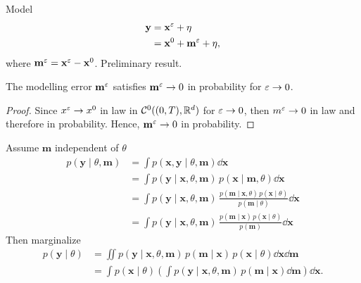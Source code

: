 \documentclass[10pt]{article}
\begin{document}
Model 
\begin{equation}
\begin{aligned}
	\mathbf y &= \mathbf x^\varepsilon + \eta \\
	&= \mathbf x^0 + \mathbf m^\varepsilon + \eta,
\end{aligned}
\end{equation}
where $\mathbf m^\varepsilon = \mathbf x^\varepsilon - \mathbf x^0$. Preliminary result.
\begin{lemma} The modelling error $\mathbf m^\varepsilon$ satisfies $\mathbf m^\varepsilon \to 0$ in probability for $\varepsilon \to 0$.
\end{lemma}
\begin{proof} Since $x^\varepsilon \to x^0$ in law in $\mathcal C^0((0, T), \mathbb{R}^d)$ for $\varepsilon \to 0$, then $m^\varepsilon \to 0$ in law and therefore in probability. Hence, $\mathbf m^\varepsilon \to 0$ in probability.
\end{proof}
Assume $\mathbf m$ independent of $\theta$
\begin{equation}
\begin{aligned}
	p(\mathbf y \mid \theta, \mathbf m) &= \int p(\mathbf x , \mathbf y \mid \theta, \mathbf m) \dd \mathbf x\\
	&= \int p(\mathbf y \mid \mathbf x, \theta, \mathbf m) \, p(\mathbf x \mid \mathbf m, \theta) \dd \mathbf x \\
	&= \int p(\mathbf y \mid \mathbf x, \theta, \mathbf m) \, \frac{p(\mathbf m\mid \mathbf x, \theta) \, p(\mathbf x \mid \theta)}{p(\mathbf m \mid \theta)} \dd \mathbf x\\
	&= \int p(\mathbf y \mid \mathbf x, \theta, \mathbf m) \, \frac{p(\mathbf m\mid \mathbf x) \, p(\mathbf x \mid \theta)}{p(\mathbf m)} \dd \mathbf x
\end{aligned}
\end{equation}
Then marginalize
\begin{equation}
\begin{aligned}
	p(\mathbf y \mid \theta) &= \iint p(\mathbf y \mid \mathbf x, \theta, \mathbf m) \, p(\mathbf m\mid \mathbf x) \, p(\mathbf x \mid \theta) \dd \mathbf x \dd \mathbf m\\
	&= \int p(\mathbf x \mid \theta) \left(\int p(\mathbf y \mid \mathbf x, \theta, \mathbf m) \, p(\mathbf m\mid \mathbf x) \dd \mathbf m \right) \dd \mathbf x.
\end{aligned}
\end{equation}
\end{document}
